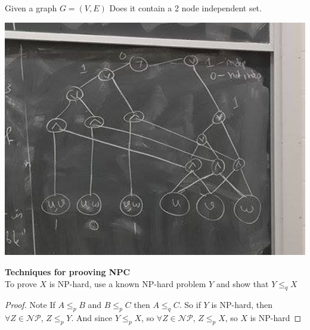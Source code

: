 \documentclass[11pt]{article}
\begin{document}
\begin{example}
    Given a graph $G = (V,E)$ Does it contain a 2 node independent set. 
    \begin{solution}
        \includegraphics[width=\textwidth/2]{circuit_1}
    \end{solution}
\end{example}

\begin{defn*}
    \textbf{Techniques for prooving NPC} \\
    To prove $X$ is NP-hard, use a known NP-hard problem $Y$ and show that $Y\leq_q X$
    \begin{proof}
        Note If $A\leq_p B$ and $B\leq_p C$ then $A\leq_q C$. So if $Y$ is NP-hard, then $\forall Z\in \mathcal{NP}$, $Z \leq_p Y$. And since $Y\leq_p X$, so $\forall Z\in \mathcal{NP}$, $Z\leq_p X$, so $X$ is NP-hard
    \end{proof}
\end{defn*}
\end{document}
